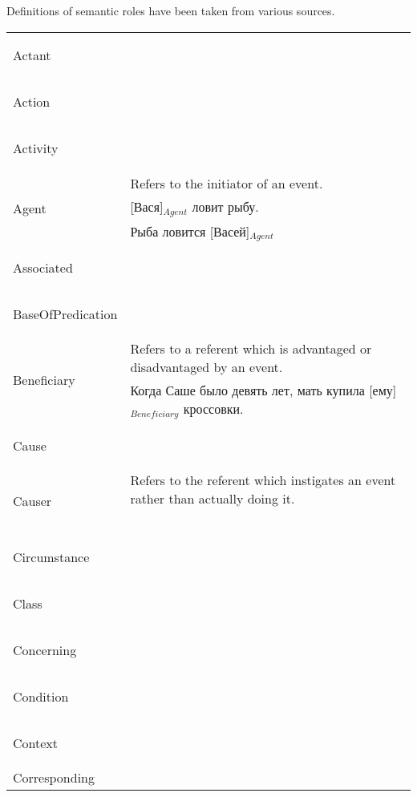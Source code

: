\documentclass[a4paper,11pt, onecolumn,twoside]{article}
\begin{document}
Definitions of semantic roles have been taken from various sources.

\begin{longtable}{ p{}  p{} } 
\toprule
 \multirow{2}{*}{Actant} & ~ \\ 
        & ~ \\
\midrule
 \multirow{2}{*}{Action} & ~ \\ 
        & ~ \\
\midrule
 \multirow{2}{*}{Activity} & ~ \\ 
        & ~ \\
\midrule
 \multirow{3}{*}{Agent} & Refers to the initiator of an event. \\ 
        & [Вася]$_{Agent}$ ловит рыбу. \\
        & Рыба ловится [Васей]$_{Agent}$ \\
\midrule
 \multirow{2}{*}{Associated} & ~ \\ 
        & ~ \\
\midrule
 \multirow{2}{*}{BaseOfPredication} & ~ \\ 
        & ~ \\
\midrule
 \multirow{2}{*}{Beneficiary} & Refers to a referent which is advantaged or disadvantaged by an event. \\ 
        & Когда Саше было девять лет, мать купила [ему]$_{Beneficiary}$ кроссовки. \\
\midrule
 \multirow{2}{*}{Cause} & ~ \\ 
        & ~ \\
\midrule
 \multirow{2}{*}{Causer} & Refers to the referent which instigates an event rather than actually doing it. \\ 
        & ~ \\
\midrule
 \multirow{2}{*}{Circumstance} & ~ \\ 
        & ~ \\
\midrule
 \multirow{2}{*}{Class} & ~ \\ 
        & ~ \\
\midrule
 \multirow{2}{*}{Concerning} & ~ \\ 
        & ~ \\
\midrule
 \multirow{2}{*}{Condition} & ~ \\ 
        & ~ \\
\midrule
 \multirow{2}{*}{Context} & ~ \\ 
        & ~ \\
\midrule
 \multirow{2}{*}{Corresponding} & ~ \\ 

\end{longtable}
\end{document}
